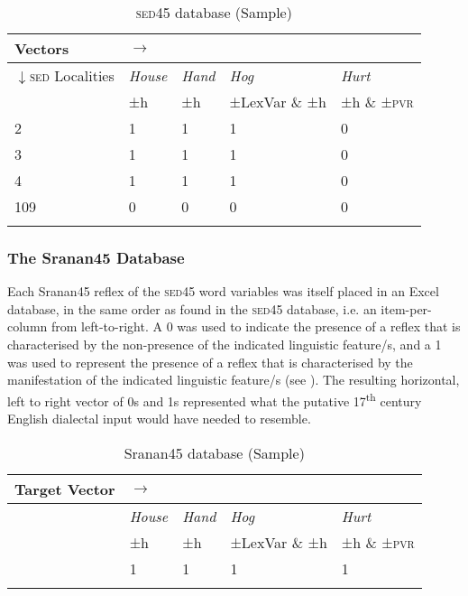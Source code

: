 {{{{{{{{{\begin{table}
\begin{tabular}{lllll}
\lsptoprule 
Vectors & \multicolumn{1}{l}{$\longrightarrow$}\\
\midrule 
$\downarrow$\textsc{sed} Localities \cellcolor{gray!35} & \emph{House} & \emph{Hand} & \emph{Hog} & \emph{Hurt} \\
 \cellcolor{gray!35} & ±h  & ±h & ±LexVar \& ±h & ±h \& ±\textsc{pvr} \\
 2 \cellcolor{gray!35} & 1 & 1 & 1 & 0 \\
 3 \cellcolor{gray!35} & 1 & 1 & 1 & 0 \\
 4 \cellcolor{gray!35} & 1 & 1 & 1 & 0 \\
109 \cellcolor{gray!35} & 0 & 0 & 0 & 0 \\
\lspbottomrule 
\end{tabular}
\caption{\textsc{sed45} database (Sample)}
\label{Table 3.9}
\end{table}

\subsubsection{The Sranan45 Database}
Each Sranan45 reflex of the \textsc{sed45} word variables was itself placed in an Excel database, in the same order as found in the \textsc{sed45} database, i.e. an item-per-column from left-to-right. A 0 was used to indicate the presence of a reflex that is characterised by the non-presence of the indicated linguistic feature/s, and a 1 was used to represent the presence of a reflex that is characterised by the manifestation of the indicated linguistic feature/s (see ). The resulting horizontal, left to right vector of 0s and 1s represented what the putative 17\textsuperscript{th} century English dialectal input would have needed to resemble.
\clearpage

\begin{table}
\begin{tabular}{lllll}
\lsptoprule 
Target Vector & \multicolumn{1}{l}{$\longrightarrow$}\\
\midrule 
& \emph{House} & \emph{Hand} & \emph{Hog} & \emph{Hurt} \\
& ±h  & ±h & ±LexVar \& ±h & ±h \& ±\textsc{pvr} \\
& 1 & 1 & 1 & 1 \\
\lspbottomrule 
\end{tabular}
\caption{Sranan45 database (Sample)}
\label{Table 3.10}
\end{table}

}}}}}}}}}
